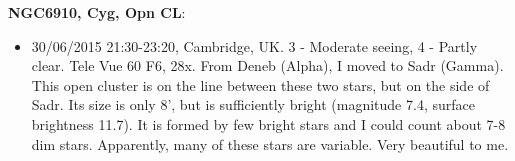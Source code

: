 {\bf NGC6910, Cyg, Opn CL}:
\begin{itemize}
\item 30/06/2015 21:30-23:20, Cambridge, UK. 3 - Moderate seeing, 4 - Partly clear. Tele Vue 60 F6, 28x. From Deneb (Alpha), I moved to Sadr (Gamma). This open cluster is on the line between these two stars, but on the side of Sadr. Its size is only 8', but is sufficiently bright (magnitude 7.4, surface brightness 11.7). It is formed by few bright stars and I could count about 7-8 dim stars. Apparently, many of these stars are variable. Very beautiful to me. 
\end{itemize}
